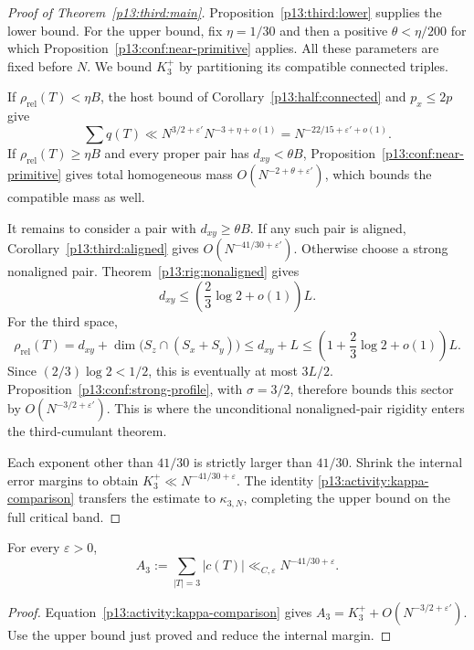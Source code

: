 \begin{proof}[Proof of Theorem~\ref{p13:third:main}]
Proposition~\ref{p13:third:lower} supplies the lower bound.
For the upper bound, fix $\eta=1/30$ and then a positive
$\theta<\eta/200$ for which
Proposition~\ref{p13:conf:near-primitive} applies.
All these parameters are fixed before $N$.
We bound $K_3^+$ by partitioning its compatible connected triples.

If $\rho_{\mathrm{rel}}(T)<\eta B$, the host bound of
Corollary~\ref{p13:half:connected} and $p_x\leq2p$ give
\[
 \sum q(T)\ll
        N^{3/2+\varepsilon'}N^{-3+\eta+o(1)}
       =N^{-22/15+\varepsilon'+o(1)}.
\]
If $\rho_{\mathrm{rel}}(T)\geq\eta B$ and every proper pair has
$d_{xy}<\theta B$, Proposition~\ref{p13:conf:near-primitive}
gives total homogeneous mass $O(N^{-2+\theta+\varepsilon'})$,
which bounds the compatible mass as well.

It remains to consider a pair with $d_{xy}\geq\theta B$.
If any such pair is aligned, Corollary~\ref{p13:third:aligned}
gives $O(N^{-41/30+\varepsilon'})$.
Otherwise choose a strong nonaligned pair.  Theorem~\ref{p13:rig:nonaligned}
gives
\[
 d_{xy}\leq\left(\frac23\log2+o(1)\right)L.
\]
For the third space,
\[
 \rho_{\mathrm{rel}}(T)
   =d_{xy}+\dim\bigl(S_z\cap(S_x+S_y)\bigr)
   \leq d_{xy}+L
   \leq\left(1+\frac23\log2+o(1)\right)L.
\]
Since $(2/3)\log2<1/2$, this is eventually at most $3L/2$.
Proposition~\ref{p13:conf:strong-profile}, with $\sigma=3/2$,
therefore bounds this sector by $O(N^{-3/2+\varepsilon'})$.
This is where the unconditional nonaligned-pair rigidity enters the
third-cumulant theorem.

Each exponent other than $41/30$ is strictly larger than $41/30$.
Shrink the internal error margins to obtain
$K_3^+\ll N^{-41/30+\varepsilon}$.
The identity \eqref{p13:activity:kappa-comparison} transfers the estimate to
$\kappa_{3,N}$, completing the upper bound on the full critical band.
\end{proof}

\begin{corollary}
\label{p13:third:activity}
For every $\varepsilon>0$,
\begin{equation}
 A_3:=\sum_{|T|=3}|c(T)|
            \ll_{C,\varepsilon}N^{-41/30+\varepsilon}.
 \label{p13:third:absolute}
\end{equation}
\end{corollary}

\begin{proof}
Equation~\eqref{p13:activity:kappa-comparison} gives
$A_3=K_3^++O(N^{-3/2+\varepsilon'})$.
Use the upper bound just proved and reduce the internal margin.
\end{proof}

